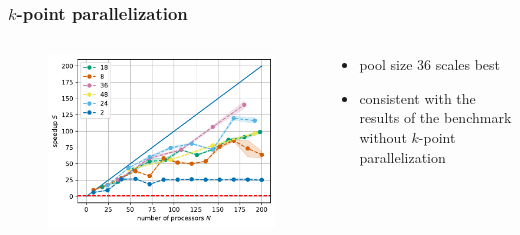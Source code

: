\documentclass[aspectratio=169]{beamer}
\begin{document}
\begin{frame}
	\frametitle{\(k\)-point parallelization}
	
	\begin{columns}
		\begin{column}{0.5\textwidth}
			\begin{figure}
				\includegraphics[width=\textwidth]{figs/TaS2_intel_bench_nk_speedup.pdf}
			\end{figure}
		\end{column}

		\begin{column}{0.5\textwidth}
			\begin{itemize}
				\item pool size 36 scales best
				\item consistent with the results of the benchmark without \(k\)-point parallelization
			\end{itemize}
		\end{column}
	\end{columns}

\end{frame}
\end{document}
